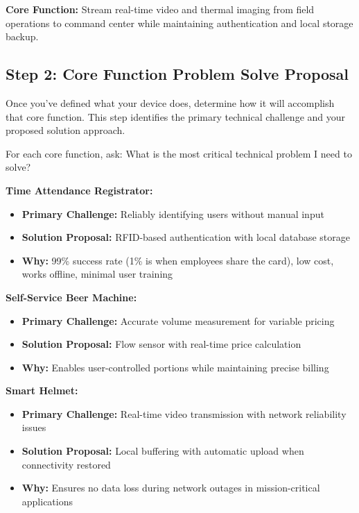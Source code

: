 \begin{tcolorbox}[colback=orange!10,colframe=orange!75!black,title=Example: Smart Helmet]
\textbf{Core Function:} Stream real-time video and thermal imaging from field operations to command center while maintaining authentication and local storage backup.
\end{tcolorbox}



\subsection{Step 2: Core Function Problem Solve Proposal}

Once you've defined what your device does, determine how it will accomplish that core function. This step identifies the primary technical challenge and your proposed solution approach.

For each core function, ask: What is the most critical technical problem I need to solve?

\textbf{Time Attendance Registrator:}
\begin{itemize}
\item \textbf{Primary Challenge:} Reliably identifying users without manual input
\item \textbf{Solution Proposal:} RFID-based authentication with local database storage
\item \textbf{Why:} 99\% success rate (1\% is when employees share the card), low cost, works offline, minimal user training
\end{itemize}

\textbf{Self-Service Beer Machine:}
\begin{itemize}
\item \textbf{Primary Challenge:} Accurate volume measurement for variable pricing
\item \textbf{Solution Proposal:} Flow sensor with real-time price calculation
\item \textbf{Why:} Enables user-controlled portions while maintaining precise billing
\end{itemize}

\textbf{Smart Helmet:}
\begin{itemize}
\item \textbf{Primary Challenge:} Real-time video transmission with network reliability issues
\item \textbf{Solution Proposal:} Local buffering with automatic upload when connectivity restored
\item \textbf{Why:} Ensures no data loss during network outages in mission-critical applications
\end{itemize}


